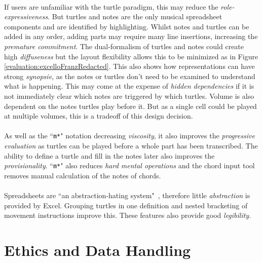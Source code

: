 \paragraph{} If users are unfamiliar with the turtle paradigm, this may reduce the \textit{role-expressiveness}. But turtles and notes are the only musical spreadsheet components and are identified by highlighting. Whilst notes and turtles can be added in any order, adding parts may require many line insertions, increasing the \textit{premature commitment}. The dual-formalism of turtles and notes could create high \textit{diffuseness} but the layout flexibility allows this to be minimized as in Figure \ref{evaluation:excelloFranzRedacted}. This also shows how representations can have strong \textit{synopsie}, as the notes or turtles don't need to be examined to understand what is happening. This may come at the expense of \textit{hidden dependencies} if it is not immediately clear which notes are triggered by which turtles. Volume is also dependent on the notes turtles play before it. But as a single cell could be played at multiple volumes, this is a tradeoff of this design decision.

\paragraph{} As well as the ``\texttt{m*}" notation decreasing \textit{viscosity}, it also improves the \textit{progressive evaluation} as turtles can be played before a whole part has been transcribed. The ability to define a turtle and fill in the notes later also improves the \textit{provisionality}. ``\texttt{m*}" also reduces \textit{hard mental operations} and the chord input tool removes manual calculation of the notes of chords.

\paragraph{} Spreadsheets are ``an abstraction-hating system"~\cite{blackwell:tutorial}, therefore little \textit{abstraction} is provided by Excel. Grouping turtles in one definition and nested bracketing of movement instructions improve this. These features also provide good \textit{legibility}.

\section{Ethics and Data Handling}

